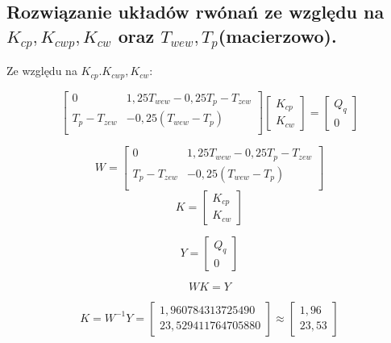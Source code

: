 \documentclass{article}
\begin{document}
\begin{flushleft}
\section{Rozwiązanie układów rwónań ze względu na $K_{cp}, K_{cwp}, K_{cw}$ oraz $T_{wew}, T_{p}$(macierzowo).}
\end{flushleft}

\begin{flushleft}
Ze względu na $K_{cp}. K_{cwp}, K_{cw}$:
\end{flushleft}
$$
\begin{bmatrix}
        0 & 1,25T_{wew}-0,25T_{p}-T_{zew}            \\[0.3em]
        T_{p}-T_{zew} & -0,25(T_{wew}-T_{p})            \\[0.3em]
    \end{bmatrix}
    \begin{bmatrix}
        K_{cp}\\
        K_{cw}
    \end{bmatrix}
    =
    \begin{bmatrix}
        Q_{q}\\
        0
    \end{bmatrix}
$$

$$
W=
\begin{bmatrix}
        0 & 1,25T_{wew}-0,25T_{p}-T_{zew}            \\[0.3em]
        T_{p}-T_{zew} & -0,25(T_{wew}-T_{p})            \\[0.3em]
    \end{bmatrix}
$$
$$
K=
\begin{bmatrix}
        K_{cp}\\
        K_{cw}
    \end{bmatrix}
$$

$$
Y=\begin{bmatrix}
        Q_{q}\\
        0
    \end{bmatrix}
$$

$$
WK=Y
$$

$$
K=W^{-1}Y=
\begin{bmatrix}
        1,960784313725490\\
        23,529411764705880
\end{bmatrix}\approx 
\begin{bmatrix}
        1,96 \\
        23,53
\end{bmatrix}
$$
\end{document}
